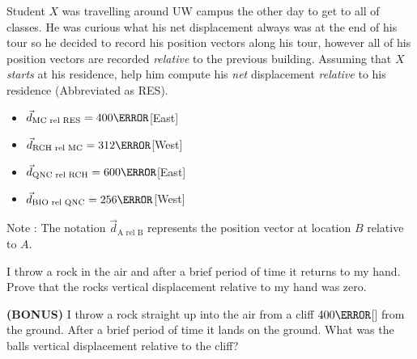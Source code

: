 \documentclass[12pt]{article} %
\newcommand{\tx}[1]{\text{#1}}
\begin{document}
\begin{qstn}[6]
Student $X$ was travelling around UW campus the other day to get to all of classes. He was curious what his net displacement always was at the end of his tour so he decided to record his position vectors along his tour, however all of his position vectors are recorded \emph{relative} to the previous building. Assuming that $X$ \emph{starts} at his residence, help him compute his \emph{net} displacement \emph{relative} to his residence (Abbreviated as RES). 

\begin{itemize}
    \item $\vec d_{\tx{MC rel RES}} = 400\m$[East]
    \item $\vec d_{\tx{RCH rel MC}} = 312\m$[West]
    \item $\vec d_{\tx{QNC rel RCH}} = 600\m$[East]
    \item $\vec d_{\tx{BIO rel QNC}} = 256\m$[West]
\end{itemize}
Note : The notation $\vec d_{\tx{A rel B}}$ represents the position vector at location $B$ relative to $A$. 
    
\end{qstn}

\begin{qstn}[7]
    I throw a rock in the air and after a brief period of time it returns to my hand. Prove that the rocks vertical displacement relative to my hand was zero.
\end{qstn}

\begin{qstn}[8]
   \textbf{(BONUS)} I throw a rock straight up into the air from a cliff $400\m$[\tx{N}] from the ground. After a brief period of time it lands on the ground. What was the balls vertical displacement relative to the cliff? 
\end{qstn}
\end{document}
